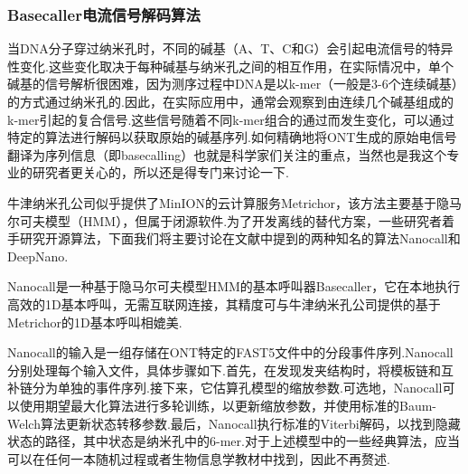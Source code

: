 \subsubsection{Basecaller电流信号解码算法}

当DNA分子穿过纳米孔时，不同的碱基（A、T、C和G）会引起电流信号的特异性变化.这些变化取决于每种碱基与纳米孔之间的相互作用，在实际情况中，单个碱基的信号解析很困难，因为测序过程中DNA是以k-mer（一般是3-6个连续碱基）的方式通过纳米孔的.因此，在实际应用中，通常会观察到由连续几个碱基组成的k-mer引起的复合信号.这些信号随着不同k-mer组合的通过而发生变化，可以通过特定的算法进行解码以获取原始的碱基序列.如何精确地将ONT生成的原始电信号翻译为序列信息（即basecalling）也就是科学家们关注的重点，当然也是我这个专业的研究者更关心的，所以还是得专门来讨论一下.


牛津纳米孔公司似乎提供了MinION的云计算服务Metrichor，该方法主要基于隐马尔可夫模型（HMM），但属于闭源软件.为了开发离线的替代方案，一些研究者着手研究开源算法，下面我们将主要讨论在文献\cite{2jain2016oxford}中提到的两种知名的算法Nanocall和DeepNano.

Nanocall\cite{david2017nanocall}是一种基于隐马尔可夫模型HMM的基本呼叫器Basecaller，它在本地执行高效的1D基本呼叫，无需互联网连接，其精度可与牛津纳米孔公司提供的基于Metrichor的1D基本呼叫相媲美.

Nanocall的输入是一组存储在ONT特定的FAST5文件中的分段事件序列.Nanocall分别处理每个输入文件，具体步骤如下.首先，在发现发夹结构时，将模板链和互补链分为单独的事件序列.接下来，它估算孔模型的缩放参数.可选地，Nanocall可以使用期望最大化算法进行多轮训练，以更新缩放参数，并使用标准的Baum-Welch算法\cite{baum1972inequality}更新状态转移参数.最后，Nanocall执行标准的Viterbi解码，以找到隐藏状态的路径，其中状态是纳米孔中的6-mer.对于上述模型中的一些经典算法，应当可以在任何一本随机过程或者生物信息学教材中找到，因此不再赘述.

